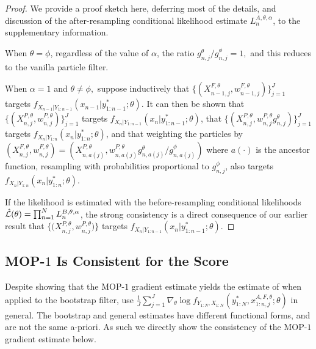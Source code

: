 \documentclass[9pt,twocolumn,twoside]{pnas-new}
\begin{document}

\begin{proof}
    We provide a proof sketch here, deferring most of the details, and discussion of the after-resampling conditional likelihood estimate $L_n^{A,\theta,\alpha}$, to the supplementary information. 
    
    When $\theta=\phi$, regardless of the value of $\alpha$, the ratio ${g_{n,j}^\theta}/{g_{n,j}^\phi}=1,$ and this reduces to the vanilla particle filter.
    
    When $\alpha=1$ and $\theta\neq\phi,$ suppose inductively that $\{(X^{F,\theta}_{n-1,j},w^{F,\theta}_{n-1,j})\}_{j=1}^J$ targets $f_{X_{n-1}|Y_{1:n-1}}(x_{n-1}|y^*_{1:n-1};\theta)$.
    It can then be shown that $\{(X^{P,\theta}_{n,j},w^{P,\theta}_{n,j})\}_{j=1}^J$ targets $f_{X_{n}|Y_{1:n-1}}(x_{n}|y^*_{1:n-1};\theta)$, that $\{(X^{P,\theta}_{n,j},w^{P,\theta}_{n,j} g^\theta_{n,j} )\}_{j=1}^J$ targets  $f_{X_{n}|Y_{1:n}}(x_{n}|y^*_{1:n};\theta)$, and that weighting the particles by $(X^{F,\theta}_{n,j},w^{F,\theta}_{n,j}) = (X^{P,\theta}_{n,a(j)}, w^{P,\theta}_{n,a(j)} g^\theta_{n,a(j)}/ g^\phi_{n,a(j)})$ where $a(\cdot)$ is the ancestor function,
    resampling with probabilities proportional to $g^\phi_{n,j}$, also targets $f_{X_{n}|Y_{1:n}}(x_{n}|y^*_{1:n};\theta)$.

    If the likelihood is estimated with the before-resampling conditional likelihoods $\hat{\mathcal{L}}(\theta) = \prod_{n=1}^N L_n^{B,\theta,\alpha}$, the strong consistency is a direct consequence of our earlier result that $\{ \big(X^{P,\theta}_{n,j},w^{P,\theta}_{n,j}\big) \}$ targets $f_{X_{n}|Y_{1:n-1}}(x_{n}|y^*_{1:n-1};\theta)$. 
\end{proof}




\subsection{MOP-$1$ Is Consistent for the Score}

Despite showing that the MOP-$1$ gradient estimate yields the estimate of \cite{poyiadjis11, scibior21} when applied to the bootstrap filter, \cite{poyiadjis11, scibior21} use $\frac{1}{J}\sum_{j=1}^J \nabla_\theta \log f_{Y_{1:N}, X_{1:N}}\left(y_{1:N}^* , x_{1:n,j}^{A, F,\theta}; \theta\right)$ in general. The bootstrap and general estimates have different functional forms, and are not the same a-priori. As such we directly show the consistency of the MOP-$1$ gradient estimate below. 
\end{document}
